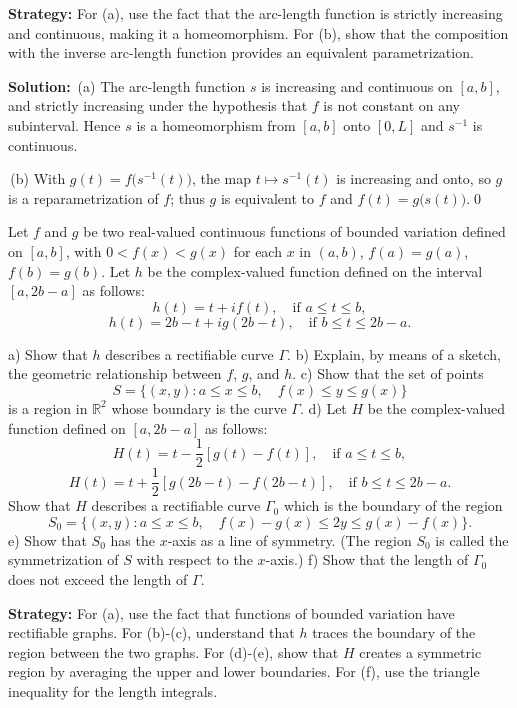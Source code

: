 \noindent\textbf{Strategy:} For (a), use the fact that the arc-length function is strictly increasing and continuous, making it a homeomorphism. For (b), show that the composition with the inverse arc-length function provides an equivalent parametrization.

\bigskip\noindent\textbf{Solution:}
\,(a) The arc-length function $s$ is increasing and continuous on $[a,b]$, and strictly increasing under the hypothesis that $f$ is not constant on any subinterval. Hence $s$ is a homeomorphism from $[a,b]$ onto $[0,L]$ and $s^{-1}$ is continuous.

\,(b) With $g(t)=f\big(s^{-1}(t)\big)$, the map $t\mapsto s^{-1}(t)$ is increasing and onto, so $g$ is a reparametrization of $f$; thus $g$ is equivalent to $f$ and $f(t)=g\big(s(t)\big)$.\qed


\begin{problembox}
\begin{problemstatement}
Let $f$ and $g$ be two real-valued continuous functions of bounded variation defined on $[a, b]$, with $0 < f(x) < g(x)$ for each $x$ in $(a, b)$, $f(a) = g(a)$, $f(b) = g(b)$. Let $h$ be the complex-valued function defined on the interval $[a, 2b - a]$ as follows:
\[h(t) = t + i f(t), \quad \text{if } a \leq t \leq b,\]
\[h(t) = 2b - t + ig(2b - t), \quad \text{if } b \leq t \leq 2b - a.\]

a) Show that $h$ describes a rectifiable curve $\Gamma$.
b) Explain, by means of a sketch, the geometric relationship between $f$, $g$, and $h$.
c) Show that the set of points
\[S = \{ (x, y) : a \leq x \leq b, \quad f(x) \leq y \leq g(x) \}\]
is a region in $\mathbb{R}^2$ whose boundary is the curve $\Gamma$.
d) Let $H$ be the complex-valued function defined on $[a, 2b - a]$ as follows:
\[H(t) = t - \frac{1}{2} [g(t) - f(t)], \quad \text{if } a \leq t \leq b,\]
\[H(t) = t + \frac{1}{2} [g(2b - t) - f(2b - t)], \quad \text{if } b \leq t \leq 2b - a.\]
Show that $H$ describes a rectifiable curve $\Gamma_0$ which is the boundary of the region
\[S_0 = \{ (x, y) : a \leq x \leq b, \quad f(x) - g(x) \leq 2y \leq g(x) - f(x) \}.\]
e) Show that $S_0$ has the $x$-axis as a line of symmetry. (The region $S_0$ is called the symmetrization of $S$ with respect to the $x$-axis.)
f) Show that the length of $\Gamma_0$ does not exceed the length of $\Gamma$.
\end{problemstatement}
\end{problembox}

\noindent\textbf{Strategy:} For (a), use the fact that functions of bounded variation have rectifiable graphs. For (b)-(c), understand that $h$ traces the boundary of the region between the two graphs. For (d)-(e), show that $H$ creates a symmetric region by averaging the upper and lower boundaries. For (f), use the triangle inequality for the length integrals.


